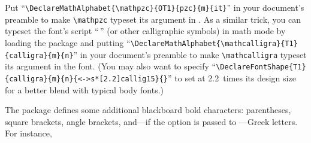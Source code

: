 \begin{center}
\ifx\mathpzc\undefined\else
\bigskip
\begin{tablenote}[*]
  Put ``\verb|\DeclareMathAlphabet{\mathpzc}{OT1}{pzc}{m}{it}|'' in your
  document's preamble to make \verb|\mathpzc| typeset its argument in
  .
\ifx\textcalligra\undefined\else
  As a similar trick, you can typeset the  font's
  script ``{\Large{}\,}'' (or other calligraphic symbols)
  in math mode by loading the  package and putting
  ``\verb|\DeclareMathAlphabet{\mathcalligra}{T1}{calligra}{m}{n}|''
  in your document's preamble to make \verb|\mathcalligra| typeset its
  argument in the  font.  (You may also want to
  specify
  ``\verb|\DeclareFontShape{T1}{calligra}{m}{n}{<->s*[2.2]callig15}{}|''
  to set  at 2.2~times its design size for a better
  blend with typical body fonts.)
\fi
\end{tablenote}
\fi

\ifx\BBmathbb\undefined\else
\bigskip
\begin{tablenote}[\dag]
  The  package defines some additional blackboard bold
  characters: parentheses, square brackets, angle brackets, and---if
  the  option is passed to
  ---Greek letters.  For
  instance,


\end{tablenote}
\end{center}
